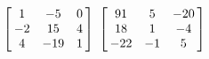 {$\left[\hskip -3pt \begin{array}{ccc} 1&-5&0\\  -2&15&4
\\  4&-19&1\end{array}\hskip -3pt \right]$ 
}
{$ \left[\hskip -3pt \begin{array}{ccc} 91&5&-20\\  18&1&-4
\\  -22&-1&5\end{array}\hskip -3pt \right]$}
